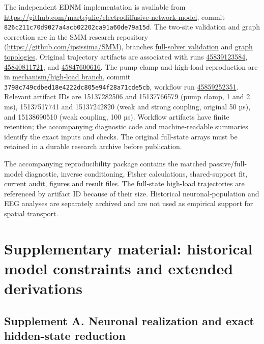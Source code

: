 \documentclass[
  11pt,
]{article}
\begin{document}
The independent EDNM implementation is available from
\url{https://github.com/martejulie/electrodiffusive-network-model},
commit \texttt{826c211c70d9027a4acb02202ca91a60de79a15d}. The two-site
validation and graph correction are in the SMM research repository
(\url{https://github.com/ipsissima/SMM}), branches
\href{https://github.com/ipsissima/SMM/tree/research/ednm-full-solver-validation-20261126}{full-solver
validation} and
\href{https://github.com/ipsissima/SMM/tree/research/graph-ednm-topologies-20261126}{graph
topologies}. Original trajectory artifacts are associated with runs
\href{https://github.com/ipsissima/SMM/actions/runs/45839123584}{45839123584},
\href{https://github.com/ipsissima/SMM/actions/runs/45840811721}{45840811721},
and
\href{https://github.com/ipsissima/SMM/actions/runs/45847600616}{45847600616}.
The pump clamp and high-load reproduction are in
\href{https://github.com/ipsissima/SMM/tree/research/ednm-mechanism-high-load-20261126}{mechanism/high-load
branch}, commit \texttt{3798c749cdbed18e4222dc805e94f28a71cde5cb},
workflow run
\href{https://github.com/ipsissima/SMM/actions/runs/45859252351}{45859252351}.
Relevant artifact IDs are 15137282506 and 15137766579 (pump clamp, 1 and
2 ms), 15137517741 and 15137242820 (weak and strong coupling, original
50 µs), and 15138690510 (weak coupling, 100 µs). Workflow artifacts have
finite retention; the accompanying diagnostic code and machine-readable
summaries identify the exact inputs and checks. The original full-state
arrays must be retained in a durable research archive before
publication.

The accompanying reproducibility package contains the matched
passive/full-model diagnostic, inverse conditioning, Fisher
calculations, shared-support fit, current audit, figures and result
files. The full-state high-load trajectories are referenced by artifact
ID because of their size. Historical neuronal-population and EEG
analyses are separately archived and are not used as empirical support
for spatial transport.

\section{Supplementary material: historical model constraints and
extended
derivations}\label{supplementary-material-historical-model-constraints-and-extended-derivations}

\subsection{Supplement A. Neuronal realization and exact hidden-state
reduction}\label{supplement-a.-neuronal-realization-and-exact-hidden-state-reduction}
\end{document}
